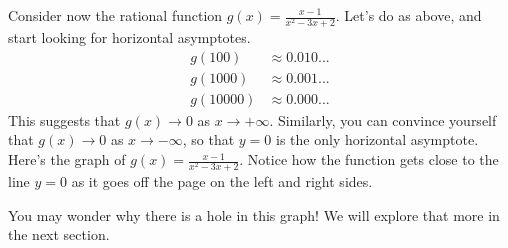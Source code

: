 \documentclass{ximera}
\begin{document}
\begin{example}
Consider now the rational function $g(x) = \frac{x-1}{x^2-3x+2}$. Let's do as above, and start looking for horizontal asymptotes.
  \begin{align*}
   g(100) &\approx 0.010... \\
   g(1000) &\approx 0.001... \\
    g(10000) &\approx 0.000...
  \end{align*}
  This suggests that $g(x) \to 0$ as $x \to +\infty$. Similarly, you can convince yourself that $g(x) \to 0$ as $x \to -\infty$, so that $y=0$ is the only horizontal asymptote.  Here's the graph of $g(x) = \frac{x-1}{x^2-3x+2}$.  Notice how the function gets close to the line $y=0$ as it goes off the page on the left and right sides.

      \begin{image}
      \end{image}

You may wonder why there is a hole in this graph!  We will explore that more in the next section.

\end{example}



\end{document}
